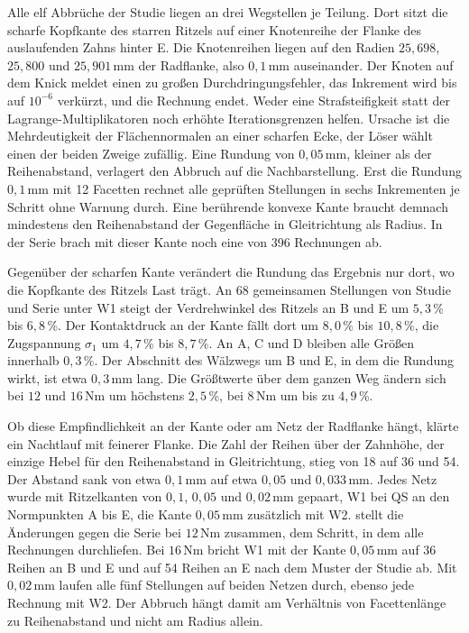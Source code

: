 Alle elf Abbrüche der Studie liegen an drei Wegstellen je Teilung. Dort sitzt die scharfe Kopfkante des starren Ritzels auf einer Knotenreihe der Flanke des auslaufenden Zahns hinter E. Die Knotenreihen liegen auf den Radien $25{,}698$, $25{,}800$ und $25{,}901$\,mm der Radflanke, also $0{,}1$\,mm auseinander. Der Knoten auf dem Knick meldet einen zu großen Durchdringungsfehler, das Inkrement wird bis auf $10^{-6}$ verkürzt, und die Rechnung endet. Weder eine Strafsteifigkeit statt der Lagrange-Multiplikatoren noch erhöhte Iterationsgrenzen helfen. Ursache ist die Mehrdeutigkeit der Flächennormalen an einer scharfen Ecke, der Löser wählt einen der beiden Zweige zufällig. Eine Rundung von $0{,}05$\,mm, kleiner als der Reihenabstand, verlagert den Abbruch auf die Nachbarstellung. Erst die Rundung $0{,}1$\,mm mit 12 Facetten rechnet alle geprüften Stellungen in sechs Inkrementen je Schritt ohne Warnung durch. Eine berührende konvexe Kante braucht demnach mindestens den Reihenabstand der Gegenfläche in Gleitrichtung als Radius. In der Serie brach mit dieser Kante noch eine von 396 Rechnungen ab.

Gegenüber der scharfen Kante verändert die Rundung das Ergebnis nur dort, wo die Kopfkante des Ritzels Last trägt. An 68 gemeinsamen Stellungen von Studie und Serie unter W1 steigt der Verdrehwinkel des Ritzels an B und E um $5{,}3$\,\% bis $6{,}8$\,\%. Der Kontaktdruck an der Kante fällt dort um $8{,}0$\,\% bis $10{,}8$\,\%, die Zugspannung $\sigma_{\mathrm{1}}$ um $4{,}7$\,\% bis $8{,}7$\,\%. An A, C und D bleiben alle Größen innerhalb $0{,}3$\,\%. Der Abschnitt des Wälzwegs um B und E, in dem die Rundung wirkt, ist etwa $0{,}3$\,mm lang. Die Größtwerte über dem ganzen Weg ändern sich bei $12$ und $16$\,Nm um höchstens $2{,}5$\,\%, bei $8$\,Nm um bis zu $4{,}9$\,\%.

Ob diese Empfindlichkeit an der Kante oder am Netz der Radflanke hängt, klärte ein Nachtlauf mit feinerer Flanke. Die Zahl der Reihen über der Zahnhöhe, der einzige Hebel für den Reihenabstand in Gleitrichtung, stieg von 18 auf 36 und 54. Der Abstand sank von etwa $0{,}1$\,mm auf etwa $0{,}05$ und $0{,}033$\,mm. Jedes Netz wurde mit Ritzelkanten von $0{,}1$, $0{,}05$ und $0{,}02$\,mm gepaart, W1 bei QS an den Normpunkten A bis E, die Kante $0{,}05$\,mm zusätzlich mit W2.  stellt die Änderungen gegen die Serie bei $12$\,Nm zusammen, dem Schritt, in dem alle Rechnungen durchliefen. Bei $16$\,Nm bricht W1 mit der Kante $0{,}05$\,mm auf 36 Reihen an B und E und auf 54 Reihen an E nach dem Muster der Studie ab. Mit $0{,}02$\,mm laufen alle fünf Stellungen auf beiden Netzen durch, ebenso jede Rechnung mit W2. Der Abbruch hängt damit am Verhältnis von Facettenlänge zu Reihenabstand und nicht am Radius allein.

